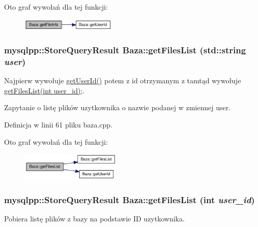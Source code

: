 Oto graf wywołań dla tej funkcji:\nopagebreak
\begin{figure}[H]
\begin{center}
\leavevmode
\includegraphics[width=129pt]{class_baza_e4a033a65cb585aa91c15fd8b8fde764_cgraph}
\end{center}
\end{figure}
\hypertarget{class_baza_2eace36725672b3a4ce639f91fe7d9bd}{
\subsubsection[{getFilesList}]{\setlength{\rightskip}{0pt plus 5cm}mysqlpp::StoreQueryResult Baza::getFilesList (std::string {\em user})}}
\label{class_baza_2eace36725672b3a4ce639f91fe7d9bd}


Najpierw wywołuje \hyperlink{class_baza_65054f08c8fd7c600f6c2fe2c7f61a43}{getUserId()} potem z id otrzymanym z tamtąd wywołuje \hyperlink{class_baza_02db3388d088212bd443ee39998b5cf8}{getFilesList(int user\_\-id)};. 

Zapytanie o listę plików uzytkownika o nazwie podanej w zmiennej user. 

Definicja w linii 61 pliku baza.cpp.

Oto graf wywołań dla tej funkcji:\nopagebreak
\begin{figure}[H]
\begin{center}
\leavevmode
\includegraphics[width=136pt]{class_baza_2eace36725672b3a4ce639f91fe7d9bd_cgraph}
\end{center}
\end{figure}
\hypertarget{class_baza_02db3388d088212bd443ee39998b5cf8}{
\subsubsection[{getFilesList}]{\setlength{\rightskip}{0pt plus 5cm}mysqlpp::StoreQueryResult Baza::getFilesList (int {\em user\_\-id})}}
\label{class_baza_02db3388d088212bd443ee39998b5cf8}


Pobiera listę plików z bazy na podstawie ID uzytkownika. 

